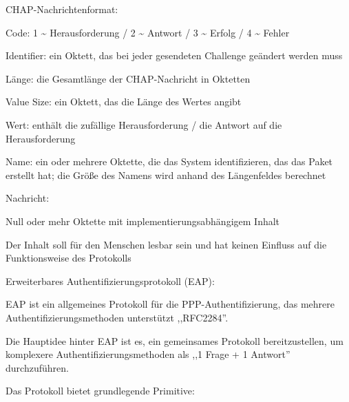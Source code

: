 \documentclass[a4paper]{article}
\begin{document}
\begin{multicols}{3}
\begin{itemize*}
\begin{itemize*}
            \end{itemize*}
            \item CHAP-Nachrichtenformat:
            \begin{itemize*}
                  \item Code: 1 \textasciitilde{} Herausforderung / 2 \textasciitilde{} Antwort / 3 \textasciitilde{} Erfolg / 4 \textasciitilde{} Fehler
                  \item Identifier: ein Oktett, das bei jeder gesendeten Challenge geändert werden muss
                  \item Länge: die Gesamtlänge der CHAP-Nachricht in Oktetten
                  \item Value Size: ein Oktett, das die Länge des Wertes angibt
                  \item Wert: enthält die zufällige Herausforderung / die Antwort auf die Herausforderung
                  \item Name: ein oder mehrere Oktette, die das System identifizieren, das das Paket erstellt hat; die Größe des Namens wird anhand des Längenfeldes berechnet
                  \item Nachricht:
                  \begin{itemize*} \item Null oder mehr Oktette mit implementierungsabhängigem Inhalt \item Der Inhalt soll für den Menschen lesbar sein und hat keinen Einfluss auf die Funktionsweise des Protokolls \end{itemize*}
            \end{itemize*}
            \item Erweiterbares Authentifizierungsprotokoll (EAP):
            \begin{itemize*}
                  \item EAP ist ein allgemeines Protokoll für die PPP-Authentifizierung, das mehrere Authentifizierungsmethoden unterstützt ,,RFC2284''.
                  \item Die Hauptidee hinter EAP ist es, ein gemeinsames Protokoll bereitzustellen, um komplexere Authentifizierungsmethoden als ,,1 Frage + 1 Antwort'' durchzuführen.
                  \item Das Protokoll bietet grundlegende Primitive:

\end{itemize*}
\end{itemize*}
\end{multicols}
\end{document}
